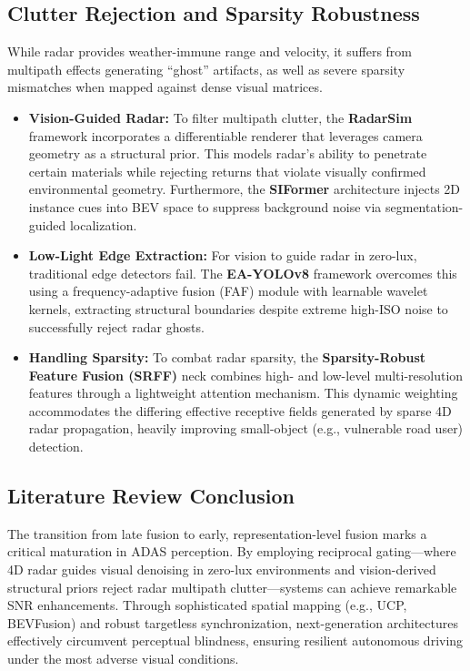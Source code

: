 \documentclass[conference]{IEEEtran}
\begin{document}
\subsection{Clutter Rejection and Sparsity Robustness}
While radar provides weather-immune range and velocity, it suffers from multipath effects generating ``ghost'' artifacts, as well as severe sparsity mismatches when mapped against dense visual matrices. 
\begin{itemize}
    \item \textbf{Vision-Guided Radar:} To filter multipath clutter, the \textbf{RadarSim} framework incorporates a differentiable renderer that leverages camera geometry as a structural prior. This models radar's ability to penetrate certain materials while rejecting returns that violate visually confirmed environmental geometry. Furthermore, the \textbf{SIFormer} architecture injects 2D instance cues into BEV space to suppress background noise via segmentation-guided localization.
    \item \textbf{Low-Light Edge Extraction:} For vision to guide radar in zero-lux, traditional edge detectors fail. The \textbf{EA-YOLOv8} framework overcomes this using a frequency-adaptive fusion (FAF) module with learnable wavelet kernels, extracting structural boundaries despite extreme high-ISO noise to successfully reject radar ghosts.
    \item \textbf{Handling Sparsity:} To combat radar sparsity, the \textbf{Sparsity-Robust Feature Fusion (SRFF)} neck combines high- and low-level multi-resolution features through a lightweight attention mechanism. This dynamic weighting accommodates the differing effective receptive fields generated by sparse 4D radar propagation, heavily improving small-object (e.g., vulnerable road user) detection.
\end{itemize}

\subsection{Literature Review Conclusion}
The transition from late fusion to early, representation-level fusion marks a critical maturation in ADAS perception. By employing reciprocal gating---where 4D radar guides visual denoising in zero-lux environments and vision-derived structural priors reject radar multipath clutter---systems can achieve remarkable SNR enhancements. Through sophisticated spatial mapping (e.g., UCP, BEVFusion) and robust targetless synchronization, next-generation architectures effectively circumvent perceptual blindness, ensuring resilient autonomous driving under the most adverse visual conditions.
\end{document}
